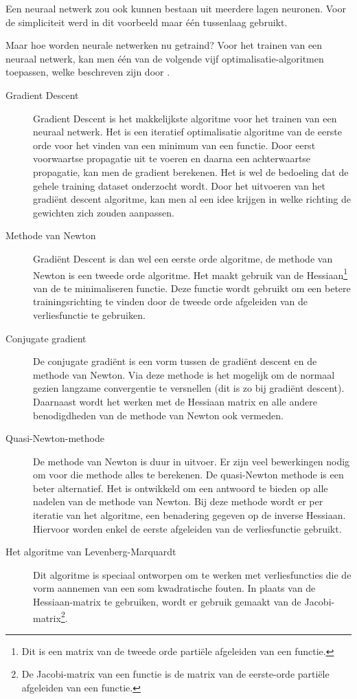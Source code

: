 Een neuraal netwerk zou ook kunnen bestaan uit meerdere lagen neuronen. Voor de simpliciteit werd in dit voorbeeld maar één tussenlaag gebruikt.

Maar hoe worden neurale netwerken nu getraind? Voor het trainen van een neuraal netwerk, kan men één van de volgende vijf optimalisatie-algoritmen toepassen, welke beschreven zijn door \textcite{neuraldesigners}.

\begin{description}
	\item[Gradient Descent] Gradient Descent is het makkelijkste algoritme voor het trainen van een neuraal netwerk. Het is een iteratief optimalisatie algoritme van de eerste orde voor het vinden van een minimum van een functie. Door eerst voorwaartse propagatie uit te voeren en daarna een achterwaartse propagatie, kan men de gradient berekenen. Het is wel de bedoeling dat de gehele training dataset onderzocht wordt. Door het uitvoeren van het gradiënt descent algoritme, kan men al een idee krijgen in welke richting de gewichten zich zouden aanpassen.
	\item[Methode van Newton] Gradiënt Descent is dan wel een eerste orde algoritme, de methode van Newton is een tweede orde algoritme. Het maakt gebruik van de Hessiaan\footnote{Dit is een matrix van de tweede orde partiële afgeleiden van een functie.} van de te minimaliseren functie. Deze functie wordt gebruikt om een betere trainingsrichting te vinden door de tweede orde afgeleiden van de verliesfunctie te gebruiken.
	\item[Conjugate gradient] De conjugate gradiënt is een vorm tussen de gradiënt descent en de methode van Newton. Via deze methode is het mogelijk om de normaal gezien langzame convergentie te versnellen (dit is zo bij gradiënt descent). Daarnaast wordt het werken met de Hessiaan matrix en alle andere benodigdheden van de methode van Newton ook vermeden.
	\item[Quasi-Newton-methode] De methode van Newton is duur in uitvoer. Er zijn veel bewerkingen nodig om voor die methode alles te berekenen. De quasi-Newton methode is een beter alternatief. Het is ontwikkeld om een antwoord te bieden op alle nadelen van de methode van Newton. Bij deze methode wordt er per iteratie van het algoritme, een benadering gegeven op de inverse Hessiaan. Hiervoor worden enkel de eerste afgeleiden van de verliesfunctie gebruikt.
	\item[Het algoritme van Levenberg-Marquardt] Dit algoritme is speciaal ontworpen om te werken met verliesfuncties die de vorm aannemen van een som kwadratische fouten. In plaats van de Hessiaan-matrix te gebruiken, wordt er gebruik gemaakt van de Jacobi-matrix\footnote{De Jacobi-matrix van een functie is de matrix van de eerste-orde partiële afgeleiden van een functie.}.
\end{description}

